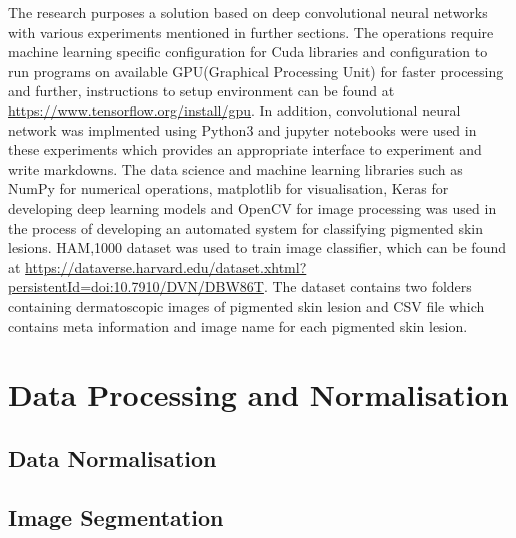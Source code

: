 The research purposes a solution based on deep convolutional neural networks with various experiments mentioned in further sections.
The operations require machine learning specific configuration for Cuda libraries and configuration to run programs on available GPU(Graphical Processing Unit) for faster processing and further, 
instructions to setup environment can be found at \url{https://www.tensorflow.org/install/gpu}. In addition, convolutional neural network was implmented using Python3 and jupyter notebooks were used in these experiments 
which provides an appropriate interface to experiment and write markdowns.
The data science and machine learning libraries such as NumPy for numerical operations, matplotlib for visualisation, Keras for developing deep learning models and OpenCV for image processing was used in the process of developing an automated system for classifying pigmented skin lesions.
HAM,1000 dataset was used to train image classifier, which can be found at
\url{https://dataverse.harvard.edu/dataset.xhtml?persistentId=doi:10.7910/DVN/DBW86T}. The dataset contains two folders containing dermatoscopic images of pigmented skin lesion and CSV file which contains meta information and image name for each pigmented skin lesion.

\section{Data Processing and Normalisation}

\subsection{Data Normalisation}

\subsection{ Image Segmentation }


